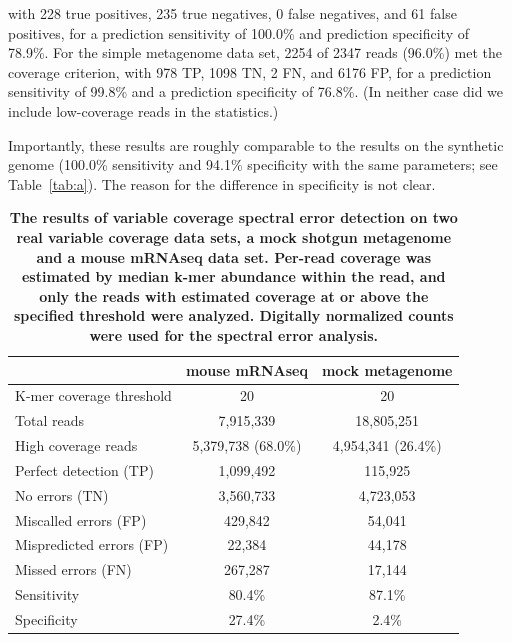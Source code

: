 \documentclass{article}
\begin{document}
with 228 true positives, 235 true negatives, 0 false negatives, and 61
false positives, for a prediction sensitivity of 100.0\% and
prediction specificity of 78.9\%.  For the simple metagenome data set,
2254 of 2347 reads (96.0\%) met the coverage criterion, with 978 TP,
1098 TN, 2 FN, and 6176 FP, for a prediction sensitivity of 99.8\% and
a prediction specificity of 76.8\%.  (In neither case did we include
low-coverage reads in the statistics.)

Importantly, these results are roughly comparable to the results on the
synthetic genome (100.0\% sensitivity and 94.1\% specificity with the
same parameters; see Table~\ref{tab:a}).  The reason for the difference
in specificity is not clear.


\begin{table}
\begin{tabular}{|l|c||c|}
\hline
& {\bf mouse mRNAseq} & {\bf mock metagenome} \\
\hline
K-mer coverage threshold   & 20                 & 20              \\
Total reads                & 7,915,339          & 18,805,251       \\
High coverage reads        & 5,379,738 (68.0\%) & 4,954,341 (26.4\%) \\
\hline
Perfect detection (TP)     & 1,099,492          & 115,925          \\
No errors (TN)             & 3,560,733          & 4,723,053         \\
Miscalled errors (FP)      & 429,842            & 54,041           \\
Mispredicted errors (FP)   & 22,384             & 44,178          \\
Missed errors (FN)         & 267,287            & 17,144            \\
\hline
Sensitivity                & 80.4\%             & 87.1\%          \\
Specificity                & 27.4\%             & 2.4\%          \\
\hline
\end{tabular}

\caption{{\bf The results of variable coverage spectral error detection on
  two real variable coverage data sets, a mock shotgun metagenome and
  a mouse mRNAseq data set. Per-read coverage was estimated by median
  k-mer abundance within the read, and only the reads with estimated
  coverage at or above the specified threshold were analyzed.
  Digitally normalized counts were used for the spectral error analysis.}}
\label{tab:spectra_variable_real}

\end{table}
\end{document}
